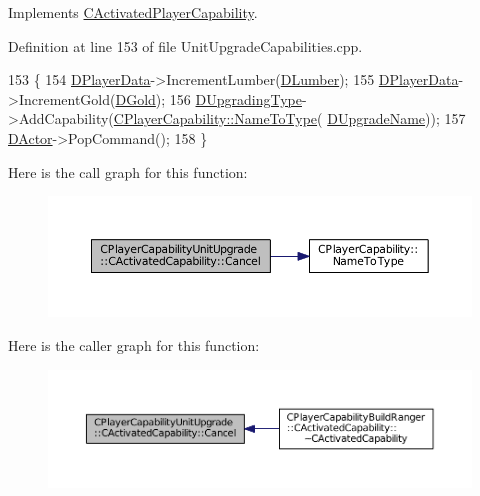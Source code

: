 Implements \hyperlink{classCActivatedPlayerCapability_a5cde83be468e262ad054d81e28684a81}{C\+Activated\+Player\+Capability}.



Definition at line 153 of file Unit\+Upgrade\+Capabilities.\+cpp.


\begin{DoxyCode}
153                                                              \{
154     \hyperlink{classCActivatedPlayerCapability_a9bf27c322a73f4b11c8183cc1973c3d8}{DPlayerData}->IncrementLumber(\hyperlink{classCPlayerCapabilityUnitUpgrade_1_1CActivatedCapability_aa4de5f57ea9d8dd85d7e6f62015c4a8d}{DLumber});
155     \hyperlink{classCActivatedPlayerCapability_a9bf27c322a73f4b11c8183cc1973c3d8}{DPlayerData}->IncrementGold(\hyperlink{classCPlayerCapabilityUnitUpgrade_1_1CActivatedCapability_a259a99f41ef918edf79f6827dec06559}{DGold});
156     \hyperlink{classCPlayerCapabilityUnitUpgrade_1_1CActivatedCapability_a028e222f2adc8a1035090487c93b358b}{DUpgradingType}->AddCapability(\hyperlink{classCPlayerCapability_a920a696526e8a839f728192aea0ba1c5}{CPlayerCapability::NameToType}(
      \hyperlink{classCPlayerCapabilityUnitUpgrade_1_1CActivatedCapability_acb0261591d692393b3c864d75edc799f}{DUpgradeName}));
157     \hyperlink{classCActivatedPlayerCapability_a54ca944b47bff2718330639941d402b0}{DActor}->PopCommand();
158 \}
\end{DoxyCode}
Here is the call graph for this function\+:
\nopagebreak
\begin{figure}[H]
\begin{center}
\leavevmode
\includegraphics[width=350pt]{classCPlayerCapabilityUnitUpgrade_1_1CActivatedCapability_a29b41666081cf420e9f3b7d93c09920b_cgraph}
\end{center}
\end{figure}
Here is the caller graph for this function\+:
\nopagebreak
\begin{figure}[H]
\begin{center}
\leavevmode
\includegraphics[width=350pt]{classCPlayerCapabilityUnitUpgrade_1_1CActivatedCapability_a29b41666081cf420e9f3b7d93c09920b_icgraph}
\end{center}
\end{figure}
